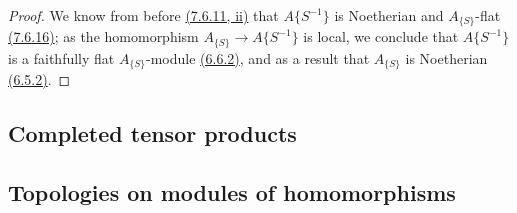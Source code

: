 \begin{proof}
\label{proof-0.7.6.18}
We know from before \hyperref[0.7.6.11]{(7.6.11, ii)} that $A\{S^{-1}\}$ is Noetherian and
$A_{\{S\}}$-flat \hyperref[0.7.6.16]{(7.6.16)}; as the homomorphism $A_{\{S\}}\to A\{S^{-1}\}$
is local, we conclude that $A\{S^{-1}\}$ is a faithfully flat $A_{\{S\}}$-module
\hyperref[0.6.6.2]{(6.6.2)}, and as a result that $A_{\{S\}}$ is Noetherian
\hyperref[0.6.5.2]{(6.5.2)}.
\end{proof}

\subsection{Completed tensor products}
\label{subsection-completed-tensor-prods}

\subsection{Topologies on modules of homomorphisms}
\label{subsection-topologies-on-hom-modules}

